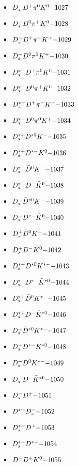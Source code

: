 \begin{multicols}{3}
\begin{itemize}
 \item $ D_{s}^{-} D^{+} \pi^{0} K^{0} \hfill{-1027}$
 \item $ D_{s}^{-} D^{0} \pi^{+} K^{0} \hfill{-1028}$
 \item $ D_{s}^{-} D^{+} \pi^{-} K^{+} \hfill{-1029}$
 \item $ D_{s}^{-} D^{0} \pi^{0} K^{+} \hfill{-1030}$
 \item $ D_{s}^{*-} D^{+} \pi^{0} K^{0} \hfill{-1031}$
 \item $ D_{s}^{*-} D^{0} \pi^{+} K^{0} \hfill{-1032}$
 \item $ D_{s}^{*-} D^{+} \pi^{-} K^{+} \hfill{-1033}$
 \item $ D_{s}^{*-} D^{0} \pi^{0} K^{+} \hfill{-1034}$
 \item $ D_{s}^{*+} \bar{D}^{*0} K^{-} \hfill{-1035}$
 \item $ D_{s}^{*+} D^{*-} \bar{K}^{0} \hfill{-1036}$
 \item $ D_{s}^{*+} \bar{D}^{0} K^{-} \hfill{-1037}$
 \item $ D_{s}^{*+} D^{-} \bar{K}^{0} \hfill{-1038}$
 \item $ D_{s}^{+} \bar{D}^{*0} K^{-} \hfill{-1039}$
 \item $ D_{s}^{+} D^{*-} \bar{K}^{0} \hfill{-1040}$
 \item $ D_{s}^{+} \bar{D}^{0} K^{-} \hfill{-1041}$
 \item $ D_{s}^{+} D^{-} \bar{K}^{0} \hfill{-1042}$
 \item $ D_{s}^{*+} \bar{D}^{*0} K^{*-} \hfill{-1043}$
 \item $ D_{s}^{*+} D^{*-} \bar{K}^{*0} \hfill{-1044}$
 \item $ D_{s}^{*+} \bar{D}^{0} K^{*-} \hfill{-1045}$
 \item $ D_{s}^{*+} D^{-} \bar{K}^{*0} \hfill{-1046}$
 \item $ D_{s}^{+} \bar{D}^{*0} K^{*-} \hfill{-1047}$
 \item $ D_{s}^{+} D^{*-} \bar{K}^{*0} \hfill{-1048}$
 \item $ D_{s}^{+} \bar{D}^{0} K^{*-} \hfill{-1049}$
 \item $ D_{s}^{+} D^{-} \bar{K}^{*0} \hfill{-1050}$
 \item $ D_{s}^{-} D^{+} \hfill{-1051}$
 \item $ D^{*+} D_{s}^{-} \hfill{-1052}$
 \item $ D_{s}^{*-} D^{+} \hfill{-1053}$
 \item $ D_{s}^{*-} D^{*+} \hfill{-1054}$
 \item $ D^{-} D^{+} K^{0} \hfill{-1055}$

\end{itemize}
\end{multicols}

